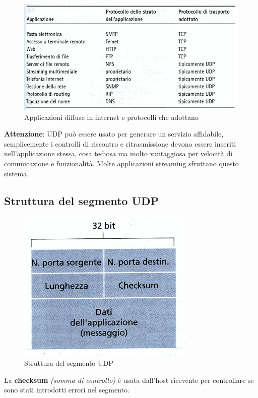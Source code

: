 \documentclass[11pt,a4paper]{book}
\begin{document}
\begin{figure}
	\includegraphics[scale=0.6]{img/014.png}
	\caption{Applicazioni diffuse in internet e protocolli che adottano}
\end{figure}
\textbf{Attenzione}: UDP può essere usato per generare un servizio affidabile, semplicemente i controlli di riscontro e ritrasmissione devono essere inseriti nell'applicazione stessa, cosa tediosa ma molto vantaggiosa per velocità di comunicazione e funzionalità. Molte applicazioni streaming sfruttano questo sistema. \\
\subsection{Struttura del segmento UDP}

\begin{figure}
	\begin{center}
		\includegraphics[scale=1]{img/015.png}
		\caption{Struttura del segmento UDP}
	\end{center}
\end{figure}

La \textbf{checksum} \textit{(somma di controllo)} è usata dall'host ricevente per controllare se sono stati introdotti errori nel segmento.
\end{document}
